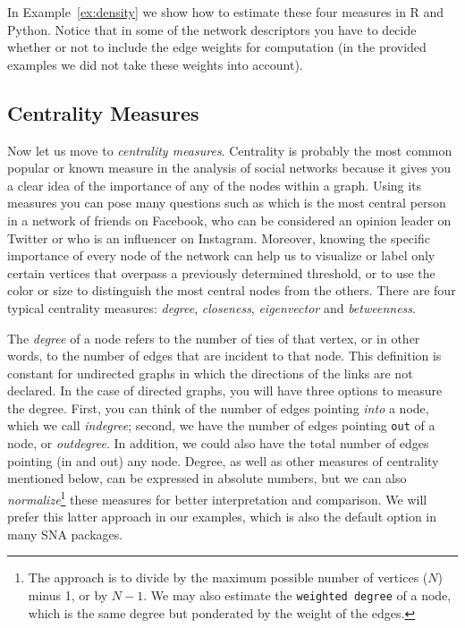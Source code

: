 In Example~\ref{ex:density} we show how to estimate these four measures in R and Python. Notice that in some of the network descriptors you have to decide whether or not to include the edge weights for computation (in the provided examples we did not take these weights into account).


\subsection{Centrality Measures}

Now let us move to \emph{centrality measures}. Centrality is probably the most common popular or known measure in the analysis of social networks because it gives you a clear idea of the importance of any of the nodes within a graph. Using its measures you can pose many questions such as which is the most central person in a network of friends on Facebook, who can be considered an opinion leader on Twitter or who is an influencer on Instagram. Moreover, knowing the specific importance of every node of the network can help us to visualize or label only certain vertices that overpass a previously determined threshold, or to use the color or size to distinguish the most central nodes from the others. There are four typical centrality measures: \emph{degree}, \emph{closeness}, \emph{eigenvector} and \emph{betweenness}.

The \emph{degree} of a node refers to the number of ties of that vertex, or in other words, to the number of edges that are incident to that node. This definition is constant for undirected graphs in which the directions of the links are not declared. In the case of directed graphs, you will have three options to measure the degree. First, you can think of the number of edges pointing \emph{into} a node, which we call \emph{indegree}; second, we have the number of edges pointing \texttt{out} of a node, or \emph{outdegree}. In addition, we could also have the total number of edges pointing (in and out) any node. Degree, as well as other measures of centrality mentioned below, can be expressed in absolute numbers, but we can also \emph{normalize}\footnote{The approach is to divide by the maximum possible number of vertices ($N$) minus 1, or by $N-1$. We may also estimate the \texttt{weighted degree} of a node, which is the same degree but ponderated by the weight of the edges.}  these measures for better interpretation and comparison. We will prefer this latter approach in our examples, which is also the default option in many SNA packages.

